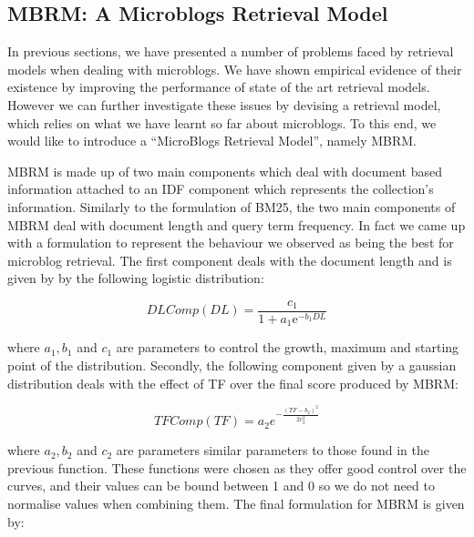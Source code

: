 %
%
%

\subsection{MBRM: A Microblogs Retrieval Model}

In previous sections, we have presented a number of problems faced by retrieval models when dealing with microblogs. We have shown empirical evidence of their existence by improving the performance of state of the art retrieval models. However we can further investigate these issues by devising a retrieval model, which relies on what we have learnt so far about microblogs. To this end, we would like to introduce a ``MicroBlogs Retrieval Model'', namely MBRM.

MBRM is made up of two main components which deal with document based information attached to an IDF component which represents the collection's information. Similarly to the formulation of BM25, the two main components of MBRM deal with document length and query term frequency. In fact we came up with a formulation to represent the behaviour we observed as being the best for microblog retrieval. The first component deals with the document length and is given by by the following logistic distribution:

\begin{equation}
DLComp(DL)={\frac  {c_1}{1+{a_1\mathrm  e}^{{-b_1DL}}}}
\end{equation}

where \(a_1, b_1\) and \(c_1\) are parameters to control the growth, maximum and starting point of the distribution. Secondly, the following component given by a gaussian distribution deals with the effect of TF over the final score produced by MBRM:

\begin{equation}
TFComp\left(TF\right)=a_2e^{-{\frac {(TF-b_2)^{2}}{2c_2^{2}}}}
\end{equation}

where \(a_2, b_2\) and \(c_2\) are parameters similar parameters to those found in the previous function. These functions were chosen as they offer good control over the curves, and their values can be bound between 1 and 0 so we do not need to normalise values when combining them. The final formulation for MBRM is given by: 

